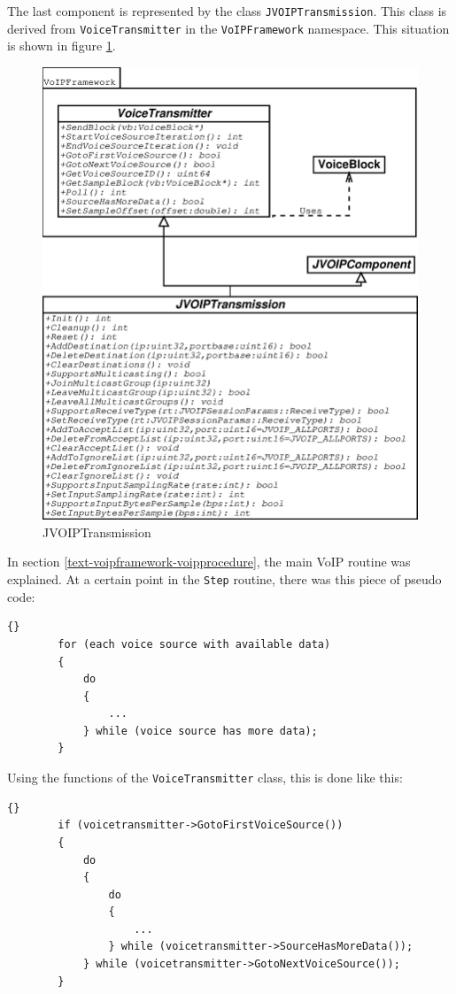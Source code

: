 			The last component is represented by the class {\tt JVOIPTransmission}. This
			class is derived from {\tt VoiceTransmitter} in the {\tt VoIPFramework} namespace.
			This situation is shown in figure \ref{class-jvoiptransmission}.
			\begin{figure}
				\center
				\includegraphics[width=\linewidth]{images/manual/chapter2/class-jvoiptransmission.eps}
				\caption{JVOIPTransmission}
				\label{class-jvoiptransmission}
			\end{figure}
			
			In section \ref{text-voipframework-voipprocedure}, the main VoIP routine
			was explained. At a certain point in the {\tt Step} routine, there was
			this piece of pseudo code:
			\begin{lstlisting}[frame=tb]{}
		for (each voice source with available data)
		{
			do
			{
				...
			} while (voice source has more data);
		}
			\end{lstlisting}
			
			Using the functions of the {\tt VoiceTransmitter} class, this is done
			like this:
			\begin{lstlisting}[frame=tb]{}
		if (voicetransmitter->GotoFirstVoiceSource())
		{
			do
			{
				do
				{
					...
				} while (voicetransmitter->SourceHasMoreData());
			} while (voicetransmitter->GotoNextVoiceSource());
		}
			\end{lstlisting}
			
